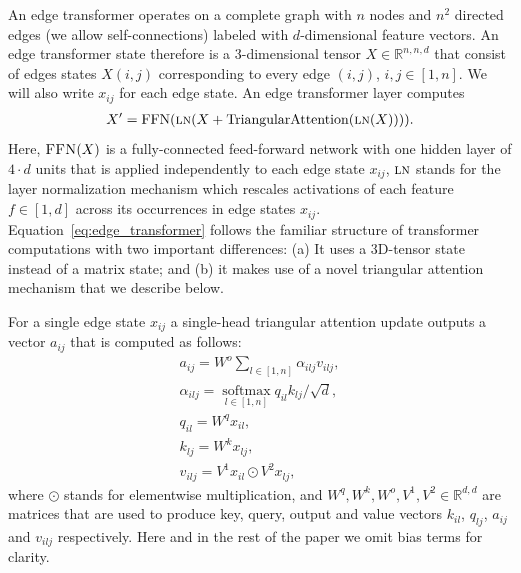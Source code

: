 \documentclass{article}
\DeclareMathOperator*{\softmax}{softmax}
\begin{document}
An edge transformer operates on a complete graph with $n$ nodes and
$n^2$ directed edges (we allow self-connections) labeled with
$d$-dimensional feature vectors. An edge transformer state therefore
is a 3-dimensional tensor $X \in \mathbb{R}^{n, n, d}$ that consist
of edges states $X(i,j)$ corresponding to every edge $(i, j)$,
$i, j \in \left[1, n\right]$. We will also write $x_{ij}$ for each
edge state. An edge transformer layer computes
\begin{align}
  X' = \mathrm{FFN}(\textsc{ln}(X +\mathrm{TriangularAttention}(\textsc{ln}(X)))).
    \label{eq:edge_transformer}
\end{align}
Here, $\textsc{FFN}(X)$ is a fully-connected feed-forward network with
one hidden layer of $4 \cdot d$ units that is applied independently to each
edge state $x_{ij}$, $\textsc{ln}$ stands for the layer normalization
mechanism \citep{ba_layer_2016} which rescales activations of each
feature $f \in \left[1, d\right]$ across its occurrences in edge
states $x_{ij}$. Equation~\ref{eq:edge_transformer} follows the
familiar structure of transformer \citep{vaswani_attention_2017}
computations with two important differences: (a) It uses a 3D-tensor state
instead of a matrix state; and (b) it makes use of a novel triangular attention
mechanism that we describe below.

For a single edge state $x_{ij}$ a single-head triangular attention update
outputs a vector $a_{ij}$ that is computed as follows:
\begin{align}
    a_{ij} = W^o \sum\limits_{l \in \left[1, n\right]} \alpha_{ilj} v_{ilj},  \\
    \alpha_{ilj} = \softmax\limits_{l \in [1, n]} q_{il}  k_{lj} / \sqrt{d},
    \label{eq:edge_attention_begin}\\
    q_{il} = W^q x_{il}, \label{eq:query}\\
    k_{lj} = W^k x_{lj}, \label{eq:key}\\
    v_{ilj} = V^{1} x_{il} \odot V^2 x_{lj},
    \label{eq:edge_attention_end}
\end{align}
where $\odot$ stands for elementwise multiplication, and
$W^q, W^k, W^o, V^1, V^2 \in \mathbb{R}^{d,d}$ are matrices that are
used to produce key, query, output and value vectors $k_{il}$,
$q_{lj}$, $a_{ij}$ and $v_{ilj}$ respectively. Here and in the rest of
the paper we omit bias terms for clarity.
\end{document}

